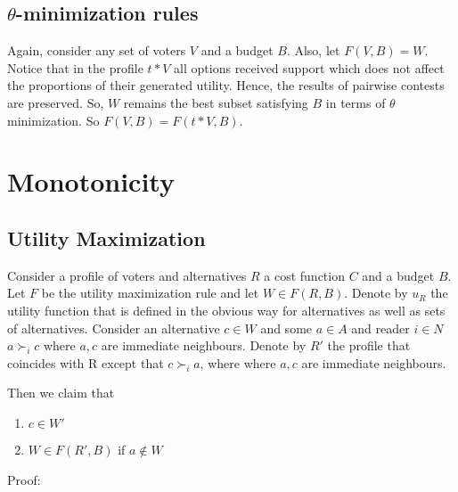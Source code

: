 \documentclass{article}
\begin{document}
\subsection{$\theta$-minimization rules}
Again, consider any set of voters $V$ and a budget $B$. Also, let $F(V, B) = W$. Notice that in the profile $t*V$ all options received support which does not affect the proportions of their generated utility. Hence, the results of pairwise contests are preserved. So, $W$ remains the best subset satisfying $B$ in terms of $\theta$ minimization. So $F(V, B) = F(t*V, B)$.

\section{Monotonicity}

\subsection{Utility Maximization}

Consider a profile of voters and alternatives $R$ a cost function $C$ and a budget $B$. Let $F$ be the utility maximization rule and let $W\in F(R,B)$. Denote by $u_R$ the utility function that is defined in the obvious way for alternatives as well as sets of alternatives. Consider an alternative $c\in W$ and some $a\in A$ and reader $i\in N$  $a\succ_i c$ where $a,c$ are immediate neighbours. Denote by $R'$ the profile that coincides with R except that $c\succ_i a$, where where $a,c$ are immediate neighbours.

Then we claim that
\begin{enumerate}
\item $c\in W'$
\item $W\in F(R',B)$ if $a\notin W$
\end{enumerate}
Proof:
\end{document}
